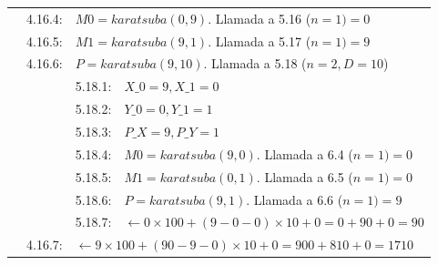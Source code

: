 \documentclass[titlepage,a4paper]{article}
\begin{document}
\begin{longtable}[r]{lllllll}
\multicolumn{4}{l}{}     & 4.16.4:     & \multicolumn{2}{l}{$M0=karatsuba(0,9)$. Llamada a 5.16 ($n=1) = \boxed{0}$}     \\
\multicolumn{4}{l}{}     & 4.16.5:     & \multicolumn{2}{l}{$M1=karatsuba(9,1)$. Llamada a 5.17 ($n=1) = \boxed{9}$}     \\
\multicolumn{4}{l}{}     & 4.16.6:     & \multicolumn{2}{l}{$P=karatsuba(9,10)$. Llamada a 5.18 ($n=2,D=10$)}     \\
\multicolumn{5}{l}{}     & 5.18.1:     & \multicolumn{1}{l}{$X\_0=9, X\_1=0$}     \\
\multicolumn{5}{l}{}     & 5.18.2:     & \multicolumn{1}{l}{$Y\_0=0, Y\_1=1$}     \\
\multicolumn{5}{l}{}     & 5.18.3:     & \multicolumn{1}{l}{$P\_X=9, P\_Y=1$}     \\
\multicolumn{5}{l}{}     & 5.18.4:     & \multicolumn{1}{l}{$M0=karatsuba(9,0)$. Llamada a 6.4 ($n=1) = \boxed{0}$}     \\
\multicolumn{5}{l}{}     & 5.18.5:     & \multicolumn{1}{l}{$M1=karatsuba(0,1)$. Llamada a 6.5 ($n=1) = \boxed{0}$}     \\
\multicolumn{5}{l}{}     & 5.18.6:     & \multicolumn{1}{l}{$P=karatsuba(9,1)$. Llamada a 6.6 ($n=1) = \boxed{9}$}     \\
\multicolumn{5}{l}{}     & 5.18.7:     & \multicolumn{1}{l}{$\leftarrow 0\times 100 + (9-0-0)\times 10 + 0 =  0 + 90 + 0 = \boxed{90}$}     \\
\multicolumn{4}{l}{}     & 4.16.7:     & \multicolumn{2}{l}{$\leftarrow 9\times 100 + (90-9-0)\times 10 + 0 =  900 + 810 + 0 = \boxed{1710}$}     \\


\end{longtable}
\end{document}
